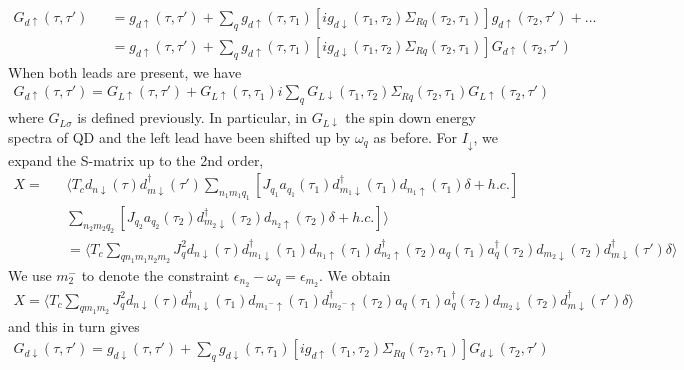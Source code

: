 \documentclass[aps,prb,superscriptaddress]{revtex4-2}
\begin{document}
\begin{eqnarray}
G_{d\uparrow}(\tau,\tau') &&= g_{d\uparrow}(\tau,\tau') + \sum_q  g_{d\uparrow}(\tau,\tau_1) [ig_{d\downarrow}(\tau_1,\tau_2)\Sigma_{Rq}(\tau_2,\tau_1)] g_{d\uparrow}(\tau_2,\tau') +... \nonumber \\
&&=g_{d\uparrow}(\tau,\tau') +\sum_q  g_{d\uparrow}(\tau,\tau_1) [ig_{d\downarrow}(\tau_1,\tau_2)\Sigma_{Rq}(\tau_2,\tau_1)] G_{d\uparrow}(\tau_2,\tau') \nonumber
\end{eqnarray}
When both leads are present, we have
\begin{eqnarray}
G_{d\uparrow}(\tau,\tau') =G_{L\uparrow}(\tau,\tau') + G_{L\uparrow}(\tau,\tau_1) i\sum_q G_{L\downarrow}(\tau_1,\tau_2)\Sigma_{Rq}(\tau_2,\tau_1) G_{L\uparrow}(\tau_2,\tau') \label{relation4}
\end{eqnarray}
where $G_{L\sigma}$ is defined previously. In particular, in $G_{L\downarrow}$ the spin down energy spectra of QD and the left lead have been shifted up by $\omega_q$ as before. For $I_\downarrow$, we expand the S-matrix up to the 2nd order,
\begin{eqnarray}
X=&&\langle T_c d_{n\downarrow}(\tau) d^{\dagger}_{m\downarrow}(\tau') \sum_{n_1 m_1 q_1}[J_{q_1} a_{q_1}(\tau_1) d^{\dagger}_{m_1\downarrow}(\tau_1) d_{n_1\uparrow}(\tau_1)\delta +h.c.]\nonumber \\
&&\sum_{n_2 m_2 q_2}[J_{q_2} a_{q_2}(\tau_2) d^{\dagger}_{m_2\downarrow}(\tau_2) d_{n_2\uparrow}(\tau_2)\delta +h.c.]\rangle \nonumber \\
&&=\langle T_c \sum_{q n_1 m_1 n_2 m_2} J_q^2 d_{n\downarrow}(\tau)d^{\dagger}_{m_1\downarrow}(\tau_1) d_{n_1\uparrow}(\tau_1) d^{\dagger}_{n_2\uparrow}(\tau_2) a_{q}(\tau_1) a^\dagger_{q}(\tau_2) d_{m_2\downarrow}(\tau_2) d^{\dagger}_{m\downarrow}(\tau')\delta \rangle \nonumber
\end{eqnarray}
We use $m_2^-$ to denote the constraint $\epsilon_{n_2}-\omega_q= \epsilon_{m_2}$. We obtain
\begin{eqnarray}
X=\langle T_c \sum_{q m_1 m_2} J_q^2 d_{n\downarrow}(\tau)d^{\dagger}_{m_1\downarrow}(\tau_1) d_{{m_1}^-\uparrow}(\tau_1) d^{\dagger}_{{m_2}^-\uparrow}(\tau_2) a_{q}(\tau_1) a^\dagger_{q}(\tau_2) d_{m_2\downarrow}(\tau_2) d^{\dagger}_{m\downarrow}(\tau')\delta \rangle \nonumber
\end{eqnarray}
and this in turn gives
\begin{eqnarray}
 G_{d\downarrow}(\tau,\tau') = g_{d\downarrow}(\tau,\tau') + \sum_q g_{d\downarrow}(\tau,\tau_1) [ig_{d\uparrow}(\tau_1,\tau_2)\Sigma_{Rq}(\tau_2,\tau_1)] G_{d\downarrow}(\tau_2,\tau') \nonumber
\end{eqnarray}
\end{document}
